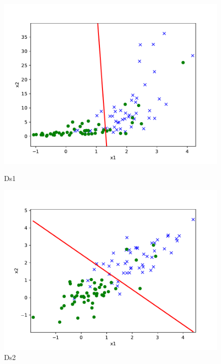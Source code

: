 \begin{answer}
	\begin{figure}[H]
		\centering
		\begin{minipage}[b]{0.46\linewidth}
			\centering
			\includegraphics[width=\linewidth]{ds1_gda.pdf}
			\caption{Ds1}%
		\end{minipage}
		\begin{minipage}[b]{0.46\linewidth}
			\centering
			\includegraphics[width=\linewidth]{ds2_gda.pdf}
			\caption{Ds2}%
		\end{minipage}
	\end{figure}
\end{answer}

